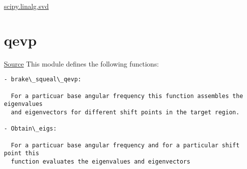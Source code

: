 \documentclass[letterpaper,10pt,english]{sphinxmanual}
\begin{document}


\href{http://docs.scipy.org/doc/scipy-0.14.0/reference/generated/scipy.linalg.svd.html}{scipy.linalg.svd}




\section{qevp}
\label{index:qevp}
\href{https://bitbucket.org/akadar/brakesqueal0.1/src/10fdbd0824e88ebbee4f44cefa781c01e586db41/brake/solve/qevp.py?at=master}{Source}
\label{index:module-brake.solve.qevp}
This module defines the following functions:

\begin{Verbatim}[commandchars=\\\{\}]
- brake\_squeal\_qevp:

  For a particuar base angular frequency this function assembles the eigenvalues
  and eigenvectors for different shift points in the target region.
  
- Obtain\_eigs:
  
  For a particuar base angular frequency and for a particular shift point this 
  function evaluates the eigenvalues and eigenvectors
\end{Verbatim}
\end{document}
